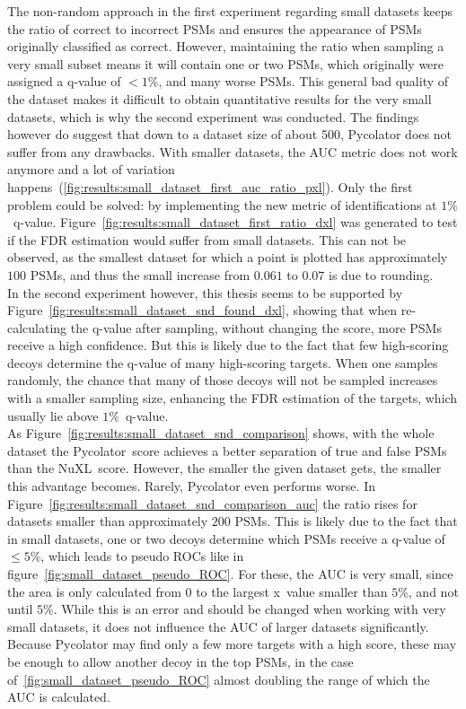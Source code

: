 The non-random approach in the first experiment regarding small datasets keeps the ratio of correct to incorrect PSMs and ensures the appearance of PSMs originally classified as correct. However, maintaining the ratio when sampling a very small subset means it will contain one or two PSMs, which originally were assigned a q-value of $<1\%$, and many worse PSMs. This general bad quality of the dataset makes it difficult to obtain quantitative results for the very small datasets, which is why the second experiment was conducted. The findings however do suggest that down to a dataset size of about 500, Pycolator does not suffer from any drawbacks. With smaller datasets, the AUC metric does not work anymore and a lot of variation happens~(\ref{fig:results:small_dataset_first_auc_ratio_pxl}). Only the first problem could be solved: by implementing the new metric of identifications at $1\%$~q-value. Figure~\ref{fig:results:small_dataset_first_ratio_dxl} was generated to test if the FDR estimation would suffer from small datasets. This can not be observed, as the smallest dataset for which a point is plotted has approximately $100$ PSMs, and thus the small increase from $0.061$ to $0.07$ is due to rounding.\\
In the second experiment however, this thesis seems to be supported by Figure~\ref{fig:results:small_dataset_snd_found_dxl}, showing that when re-calculating the q-value after sampling, without changing the score, more PSMs receive a high confidence. But this is likely due to the fact that few high-scoring decoys determine the q-value of many high-scoring targets. When one samples randomly, the chance that many of those decoys will not be sampled increases with a smaller sampling size, enhancing the FDR estimation of the targets, which usually lie above $1\%$~q-value.\\
As Figure~\ref{fig:results:small_dataset_snd_comparison} shows, with the whole dataset the Pycolator~score achieves a better separation of true and false PSMs than the NuXL~score. However, the smaller the given dataset gets, the smaller this advantage becomes. Rarely, Pycolator even performs worse. In Figure~\ref{fig:results:small_dataset_snd_comparison_auc} the ratio rises for datasets smaller than approximately $200$ PSMs. This is likely due to the fact that in small datasets, one or two decoys determine which PSMs receive a q-value of $\leq5\%$, which leads to pseudo ROCs like in figure~\ref{fig:small_dataset_pseudo_ROC}. For these, the AUC is very small, since the area is only calculated from $0$ to the largest x~value smaller than $5\%$, and not until $5\%$. While this is an error and should be changed when working with very small datasets, it does not influence the AUC of larger datasets significantly. Because Pycolator may find only a few more targets with a high score, these may be enough to allow another decoy in the top PSMs, in the case of~\ref{fig:small_dataset_pseudo_ROC} almost doubling the range of which the AUC is calculated.\\
